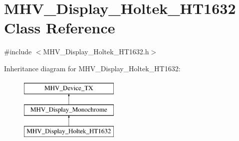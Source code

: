 \hypertarget{class_m_h_v___display___holtek___h_t1632}{
\section{\-M\-H\-V\-\_\-\-Display\-\_\-\-Holtek\-\_\-\-H\-T1632 \-Class \-Reference}
\label{class_m_h_v___display___holtek___h_t1632}
}


{\ttfamily \#include $<$\-M\-H\-V\-\_\-\-Display\-\_\-\-Holtek\-\_\-\-H\-T1632.\-h$>$}

\-Inheritance diagram for \-M\-H\-V\-\_\-\-Display\-\_\-\-Holtek\-\_\-\-H\-T1632\-:\begin{figure}[H]
\begin{center}
\leavevmode
\includegraphics[height=3.000000cm]{class_m_h_v___display___holtek___h_t1632}
\end{center}
\end{figure}
